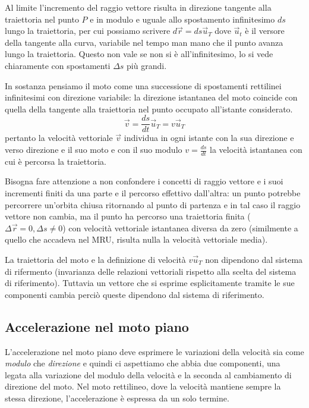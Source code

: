 \documentclass[class=book, crop=false, oneside, 12pt]{standalone}
\begin{document}
Al limite l'incremento del raggio vettore risulta in direzione tangente alla traiettoria nel punto \(P\) e in modulo e uguale allo spostamento infinitesimo \(ds\) lungo la traiettoria, 
per cui possiamo scrivere \(d \overrightarrow{r} = ds \overrightarrow{u}_T\) dove \(\overrightarrow{u}_t\) è il versore della tangente alla curva, variabile nel tempo man mano che il punto avanza lungo la traiettoria. 
Questo non vale se non si è all'infinitesimo, lo si vede chiaramente con spostamenti \(\Delta s\) più grandi.

In sostanza pensiamo il moto come una successione di spostamenti rettilinei infinitesimi con direzione variabile: la direzione istantanea del moto coincide con quella della tangente alla traiettoria nel punto occupato all'istante considerato.
\begin{equation}
  \overrightarrow{v} = \frac{ds}{dt} \overrightarrow{u}_T = v \overrightarrow{u}_T
\end{equation}
pertanto la velocità vettoriale \(\overrightarrow{v}\) individua in ogni istante con la sua direzione e verso direzione e il suo moto e con il suo modulo \(v = \frac{ds}{dt}\) la velocità istantanea con cui è percorsa la traiettoria. 

Bisogna fare attenzione a non confondere i concetti di raggio vettore e i suoi incrementi finiti da una parte e il percorso effettivo dall'altra:
un punto potrebbe percorrere un'orbita chiusa ritornando al punto di partenza e in tal caso il raggio vettore non cambia, ma il punto ha percorso una traiettoria finita (\(\Delta \overrightarrow{r} = 0, \Delta s \neq 0\)) con velocità vettoriale istantanea diversa da zero (similmente a quello che accadeva nel MRU, risulta nulla la velocità vettoriale media).

La traiettoria del moto e la definizione di velocità \(v \overrightarrow{u}_T\) non dipendono dal sistema di rifermento (invarianza delle relazioni vettoriali rispetto alla scelta del sistema di riferimento).
Tuttavia un vettore che si esprime esplicitamente tramite le sue componenti cambia perciò queste dipendono dal sistema di riferimento.

\subsection{Accelerazione nel moto piano}

L'accelerazione nel moto piano deve esprimere le variazioni della velocità sia come \emph{modulo} che \emph{direzione} e quindi ci aspettiamo che abbia due componenti, 
una legata alla variazione del modulo della velocità e la seconda al cambiamento di direzione del moto. 
Nel moto rettilineo, dove la velocità mantiene sempre la stessa direzione, l'accelerazione è espressa da un solo termine. 
\end{document}
